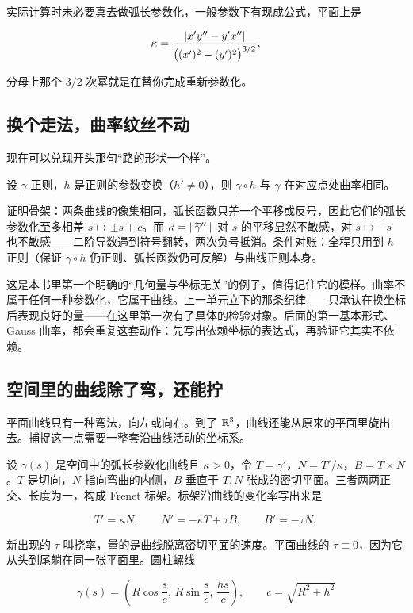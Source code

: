 实际计算时未必要真去做弧长参数化，一般参数下有现成公式，平面上是

\[
\kappa=\frac{\left|x'y''-y'x''\right|}{\bigl((x')^{2}+(y')^{2}\bigr)^{3/2}},
\]

分母上那个 \(3/2\) 次幂就是在替你完成重新参数化。

\subsection{换个走法，曲率纹丝不动}

现在可以兑现开头那句``路的形状一个样''。

\begin{proposition}
设 \(\gamma\) 正则，\(h\) 是正则的参数变换（\(h'\neq0\)），则 \(\gamma\circ h\) 与 \(\gamma\) 在对应点处曲率相同。
\end{proposition}

证明骨架：两条曲线的像集相同，弧长函数只差一个平移或反号，因此它们的弧长参数化至多相差 \(s\mapsto\pm s+c\)。而 \(\kappa=\left\lVert\widetilde\gamma''\right\rVert\) 对 \(s\) 的平移显然不敏感，对 \(s\mapsto-s\) 也不敏感——二阶导数遇到符号翻转，两次负号抵消。条件对账：全程只用到 \(h\) 正则（保证 \(\gamma\circ h\) 仍正则、弧长函数仍可反解）与曲线正则本身。

这是本书里第一个明确的``几何量与坐标无关''的例子，值得记住它的模样。曲率不属于任何一种参数化，它属于曲线。上一单元立下的那条纪律——只承认在换坐标后表现良好的量——在这里第一次有了具体的检验对象。后面的第一基本形式、Gauss 曲率，都会重复这套动作：先写出依赖坐标的表达式，再验证它其实不依赖。

\subsection{空间里的曲线除了弯，还能拧}

平面曲线只有一种弯法，向左或向右。到了 \(\mathbb{R}^{3}\)，曲线还能从原来的平面里旋出去。捕捉这一点需要一整套沿曲线活动的坐标系。

设 \(\gamma(s)\) 是空间中的弧长参数化曲线且 \(\kappa>0\)，令 \(T=\gamma'\)，\(N=T'/\kappa\)，\(B=T\times N\)。\(T\) 是切向，\(N\) 指向弯曲的内侧，\(B\) 垂直于 \(T,N\) 张成的密切平面。三者两两正交、长度为一，构成 Frenet 标架。标架沿曲线的变化率写出来是

\[
T'=\kappa N,\qquad
N'=-\kappa T+\tau B,\qquad
B'=-\tau N,
\]

新出现的 \(\tau\) 叫挠率，量的是曲线脱离密切平面的速度。平面曲线的 \(\tau\equiv0\)，因为它从头到尾躺在同一张平面里。圆柱螺线

\[
\gamma(s)=\left(R\cos\frac{s}{c},\,R\sin\frac{s}{c},\,\frac{hs}{c}\right),
\qquad c=\sqrt{R^{2}+h^{2}}
\]

